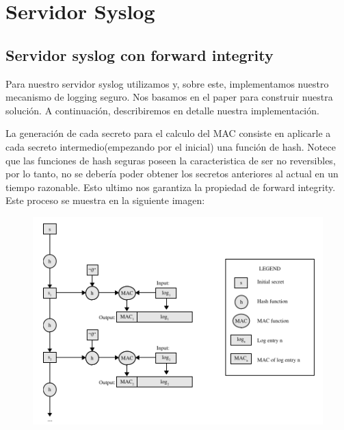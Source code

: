 \section{Servidor Syslog}

\subsection{Servidor syslog con forward integrity}
Para nuestro servidor syslog utilizamos \cite{bio6} y, sobre este, implementamos nuestro 
mecanismo de logging seguro. Nos basamos en el paper \cite{bio2} para construir nuestra solución. A continuación, describiremos en detalle nuestra implementación.

La generación de cada secreto para el calculo del MAC consiste en aplicarle a cada secreto intermedio(empezando por el inicial) una función de hash. Notece que las funciones de hash seguras poseen la caracteristica de ser no reversibles, por lo tanto, no se debería poder obtener los secretos anteriores al actual en un tiempo razonable. Esto ultimo nos garantiza la propiedad de forward integrity. Este proceso se muestra en la siguiente imagen:
\begin{figure}[H]
\centering
\includegraphics[scale=1]{imagenes/MAC.png}
\end{figure}

